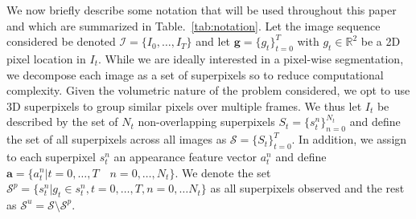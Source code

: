 We now briefly describe some notation that will be used throughout this paper and which are summarized in Table.~\ref{tab:notation}. Let the image sequence considered be denoted $\mathcal{I} = \{I_0,\ldots,I_T\}$ and let $\bm{g} = \{g_t\}_{t=0}^T$ with $g_t\in\mathbb{R}^2$ be a 2D pixel location in $I_t$. 
While we are ideally interested in a pixel-wise segmentation, we decompose each image as a set of superpixels so to reduce computational complexity. Given the volumetric nature of the problem considered, we opt to use 3D superpixels \cite{chang13} to group similar pixels over multiple frames. We thus let $I_t$ be described by the set of $N_t$ non-overlapping superpixels $S_t=\{s^n_t\}_{n=0}^{N_t}$ and define the set of all superpixels across all images as $\mathcal{S}=\{S_t\}_{t=0}^T$. In addition, we assign to each superpixel $s_t^n$ an appearance feature vector $a_t^n$ and define $\bm{a}=\{a_t^n | t=0,\ldots,T\quad n=0,\ldots,N_t\}$. We denote the set $\mathcal{S}^p = \{s^n_t | g_t \in s^n_t, t=0,\ldots,T,n=0,\ldots N_t \}$ as all superpixels observed and the rest as $\mathcal{S}^u = \mathcal{S} \setminus \mathcal{S}^p$.
